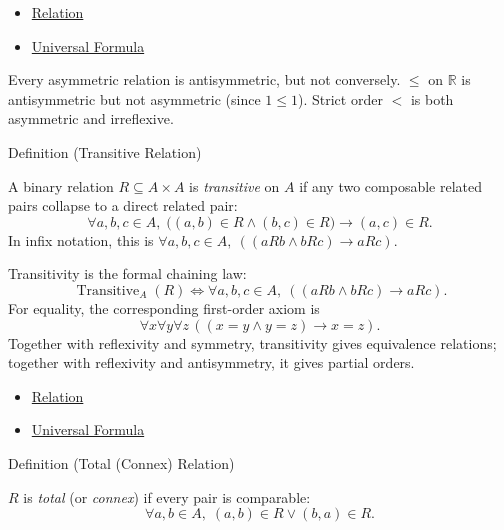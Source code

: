 \begin{dependencies}
\begin{itemize}
  \item \hyperref[def:relation]{Relation}
  \item \hyperref[def:universal-q]{Universal Formula}
\end{itemize}
\end{dependencies}

\begin{remark*}
Every asymmetric relation is antisymmetric, but not conversely. $\leq$ on
$\mathbb{R}$ is antisymmetric but not asymmetric (since $1 \leq 1$). Strict
order $<$ is both asymmetric and irreflexive.
\end{remark*}

\begin{definitionbox}{Definition (Transitive Relation)}
\begin{definition}\label{def:transitive}
A binary relation $R\subseteq A\times A$ is \emph{transitive} on $A$ if any
two composable related pairs collapse to a direct related pair:
\[
  \forall a,b,c\in A,\;
  \bigl((a,b)\in R\land(b,c)\in R\bigr)\rightarrow(a,c)\in R.
\]
In infix notation, this is
$\forall a,b,c\in A,\ ((aRb\land bRc)\rightarrow aRc)$.
\end{definition}
\end{definitionbox}


\begin{remark*}
Transitivity is the formal chaining law:
\[
  \operatorname{Transitive}_A(R)
  \iff
  \forall a,b,c\in A,\ ((aRb\land bRc)\rightarrow aRc).
\]
For equality, the corresponding first-order axiom is
\[
  \forall x\forall y\forall z\,((x=y\land y=z)\rightarrow x=z).
\]
Together with reflexivity and symmetry, transitivity gives equivalence
relations; together with reflexivity and antisymmetry, it gives partial
orders.
\end{remark*}

\begin{dependencies}
\begin{itemize}
  \item \hyperref[def:relation]{Relation}
  \item \hyperref[def:universal-q]{Universal Formula}
\end{itemize}
\end{dependencies}

\begin{definitionbox}{Definition (Total (Connex) Relation)}
\begin{definition}\label{def:total-rel}
$R$ is \emph{total} (or \emph{connex}) if every pair is comparable:
\[
\forall a,b \in A, \;
(a,b) \in R \lor (b,a) \in R.
\]
\end{definition}
\end{definitionbox}

